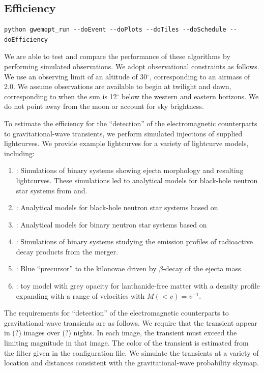 \documentclass[twocolumn]{aastex61}
\newcommand{\rednote}[1]{{\color{red} (#1)}}
\begin{document}
\subsection{Efficiency}
\begin{lstlisting}
python gwemopt_run --doEvent --doPlots --doTiles --doSchedule --doEfficiency
\end{lstlisting}
We are able to test and compare the performance of these algorithms by performing simulated observations. 
We adopt observational constraints as follows. 
We use an observing limit of an altitude of 30$^\circ$, corresponding to an airmass of 2.0. 
We assume observations are available to begin at twilight and dawn, corresponding to when the sun is 12$^\circ$ below the western and eastern horizons.
We do not point away from the moon or account for sky brightness.

To estimate the efficiency for the ``detection'' of the electromagnetic counterparts to gravitational-wave transients, we perform simulated injections of supplied lightcurves. We provide example lightcurves for a variety of lightcurve models, including:

\begin{enumerate}
\item \cite{TaHo2014}: Simulations of binary systems showing ejecta morphology and resulting lightcurves. These simulations led to analytical models for black-hole neutron star systems from \cite{KaKy2016} and\cite{DiUj2017}.
\item \cite{KaKy2016}: Analytical models for black-hole neutron star systems based on \cite{TaHo2014}
\item \cite{DiUj2017}: Analytical models for binary neutron star systems based on \cite{TaHo2014}
\item \cite{BaKa2016}: Simulations of binary systems studying the emission profiles of radioactive decay products from the merger.
\item \cite{MeBa2015}: Blue ``precursor'' to the kilonovae driven by $\beta$-decay of the ejecta mass.
\item \cite{Me2017}: toy model with grey opacity for lanthanide-free matter with a density profile expanding with a range of velocities with $M(< v) = v^{-1}$.
\end{enumerate}

The requirements for ``detection'' of the electromagnetic counterparts to gravitational-wave transients are as follows.
We require that the transient appear in \rednote{?} images over \rednote{?} nights.
In each image, the transient must exceed the limiting magnitude in that image.
The color of the transient is estimated from the filter given in the configuration file.
We simulate the transients at a variety of location and distances consistent with the gravitational-wave probability skymap.
\end{document}
